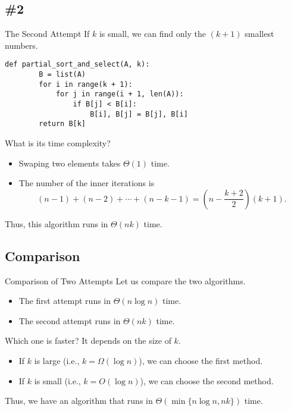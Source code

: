 \documentclass{beamer}
\begin{document}
\subsection{\#2}
\begin{frame}[fragile]{The Second Attempt}
  If $k$ is small, we can find only the $(k+1)$ smallest numbers.
  \begin{block}{}
    \scriptsize
    \begin{lstlisting}[gobble=4]
    def partial_sort_and_select(A, k):
        B = list(A)
        for i in range(k + 1):
            for j in range(i + 1, len(A)):
                if B[j] < B[i]:
                    B[i], B[j] = B[j], B[i]
        return B[k]
    \end{lstlisting}
    \pause
  \end{block}
  What is its time complexity? \pause
  \begin{itemize}
    \item Swaping two elements takes $\Theta(1)$ time. \pause
    \item The number of the inner iterations is
    \small
    \begin{equation*}
      (n-1) + (n-2) + \cdots + (n-k-1) = \left(n-\frac{k+2}{2}\right)(k+1).
    \end{equation*}
    \pause
  \end{itemize}
  \vspace{-1em}
  Thus, this algorithm runs in $\Theta(nk)$ time.
\end{frame}

\subsection{Comparison}
\begin{frame}{Comparison of Two Attempts}
  Let us compare the two algorithms. \pause
  \begin{itemize}
    \item The first attempt runs in $\Theta(n \log n)$ time. \pause
    \item The second attempt runs in $\Theta(nk)$ time. \pause
  \end{itemize}
  Which one is faster? \pause
  It depends on the size of $k$. \pause
  \begin{itemize}
    \item If $k$ is large (i.e., $k = \Omega(\log n)$), we can choose the first
    method. \pause
    \item If $k$ is small (i.e., $k = O(\log n)$), we can choose the second
    method. \pause
  \end{itemize}
  Thus, we have an algorithm that runs in $\Theta(\min\{n \log n, nk\})$ time.
\end{frame}
\end{document}
